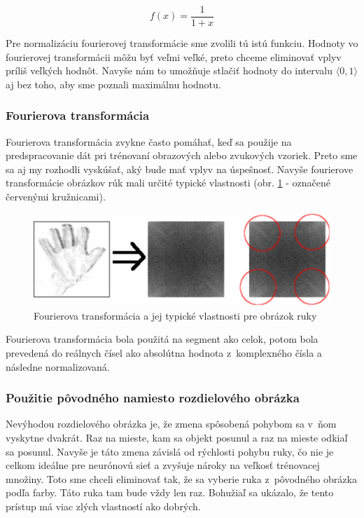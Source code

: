 $$f(x)=\frac{1}{1+x}$$
\medskip

Pre normalizáciu fourierovej transformácie sme zvolili tú istú funkciu. Hodnoty vo fourierovej transformácii môžu byť veľmi veľké, preto chceme eliminovať vplyv príliš veľkých hodnôt. Navyše nám to umožňuje stlačiť hodnoty do intervalu $\langle 0,1\rangle$ aj bez toho, aby sme poznali maximálnu hodnotu.

\subsubsection{Fourierova transformácia}
\label{chap:ft}
Fourierova transformácia zvykne často pomáhať, keď sa použije na predspracovanie dát pri trénovaní obrazových alebo zvukových vzoriek. Preto sme sa aj my rozhodli vyskúšať, aký bude mať vplyv na úspešnosť. Navyše fourierove transformácie obrázkov rúk mali určité typické vlastnosti (obr. \ref{fig:fft} - označené červenými kružnicami).

\begin{figure}[htp]
    \centering
    \includegraphics[width=\textwidth]{images/fft_preview}
    \caption{Fourierova transformácia a jej typické vlastnosti pre obrázok ruky}
    \label{fig:fft}
\end{figure}

Fourierova transformácia bola použitá na segment ako celok, potom bola prevedená do reálnych čísel ako absolútna hodnota z~komplexného čísla a následne normalizovaná.

\subsubsection{Použitie pôvodného namiesto rozdielového obrázka}
Nevýhodou rozdielového obrázka je, že zmena spôsobená pohybom sa v~ňom vyskytne dvakrát. Raz na mieste, kam sa objekt posunul a raz na mieste odkiaľ sa posunul. Navyše je táto zmena závislá od rýchlosti pohybu ruky, čo nie je celkom ideálne pre neurónovú sieť a zvyšuje nároky na veľkosť trénovacej množiny. Toto sme chceli eliminovať tak, že sa vyberie ruka z~pôvodného obrázka podľa farby. Táto ruka tam bude vždy len raz. Bohužiaľ sa ukázalo, že tento prístup má viac zlých vlastností ako dobrých.

